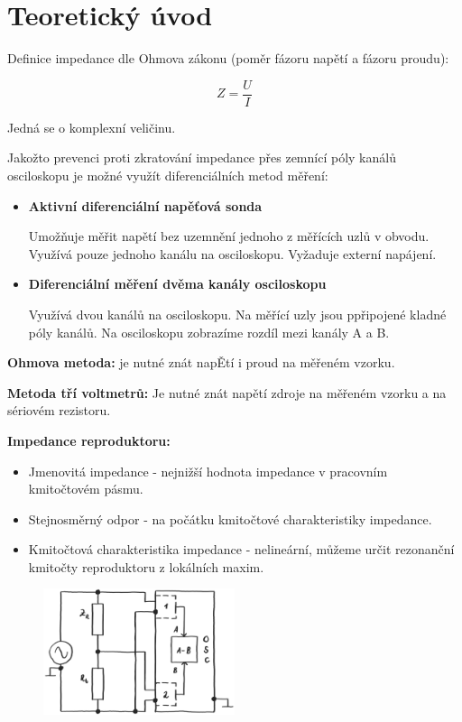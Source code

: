 \documentclass[a4paper, czech]{article}
\begin{document}
\section{Teoretický úvod}

Definice impedance dle Ohmova zákonu (poměr fázoru napětí a fázoru proudu):

\begin{equation*}
    Z = \frac{U}{I}
\end{equation*}

Jedná se o komplexní veličinu.

Jakožto prevenci proti zkratování impedance přes zemnící póly kanálů osciloskopu je možné využít diferenciálních metod měření:

\begin{itemize}
    \item \textbf{Aktivní diferenciální napěťová sonda}
    
    Umožňuje měřit napětí bez uzemnění jednoho z měřících uzlů v obvodu.
    Využívá pouze jednoho kanálu na osciloskopu.
    Vyžaduje externí napájení.
    \item \textbf{Diferenciální měření dvěma kanály osciloskopu}
    
    Využívá dvou kanálů na osciloskopu.
    Na měřící uzly jsou ppřipojené kladné póly kanálů.
    Na osciloskopu zobrazíme rozdíl mezi kanály A a B.
\end{itemize}

\textbf{Ohmova metoda:} je nutné znát napĚtí i proud na měřeném vzorku.

\textbf{Metoda tří voltmetrů:} Je nutné znát napětí zdroje na měřeném vzorku a na sériovém rezistoru.

\textbf{Impedance reproduktoru:}

\begin{itemize}
    \item Jmenovitá impedance - nejnižší hodnota impedance v pracovním kmitočtovém pásmu.
    \item Stejnosměrný odpor - na počátku kmitočtové charakteristiky impedance.
    \item Kmitočtová charakteristika impedance - nelineární, můžeme určit rezonanční kmitočty reproduktoru z lokálních maxim.
\end{itemize}

\begin{figure}[H]
    \centering
    \includegraphics[width = 0.5\textwidth]{schema3b.png}
\end{figure}
\end{document}
